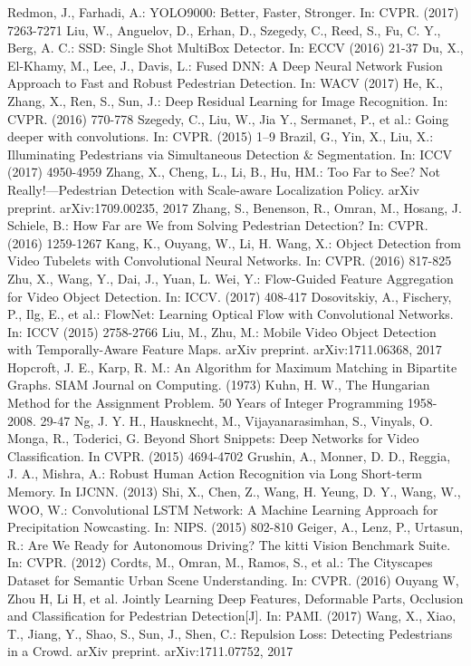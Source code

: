 \documentclass[runningheads]{llncs}
\begin{document}
\begin{thebibliography}{50}
	Redmon, J., Farhadi, A.: YOLO9000: Better, Faster, Stronger. In: CVPR. (2017) 7263-7271
    Liu, W., Anguelov, D., Erhan, D., Szegedy, C., Reed, S., Fu, C. Y., Berg, A. C.: SSD: Single Shot MultiBox Detector. In: ECCV (2016) 21-37	
 	Du, X., El-Khamy, M., Lee, J., Davis, L.: Fused DNN: A Deep Neural Network Fusion Approach to Fast and Robust Pedestrian Detection. In: WACV (2017)
 	He, K., Zhang, X., Ren, S., Sun, J.: Deep Residual Learning for Image Recognition. In: CVPR. (2016) 770-778   
	Szegedy, C., Liu, W., Jia Y., Sermanet, P., et al.: Going deeper with convolutions. In: CVPR. (2015) 1–9
	Brazil, G., Yin, X., Liu, X.: Illuminating Pedestrians via Simultaneous Detection \& Segmentation. In: ICCV (2017) 4950-4959
	Zhang, X., Cheng, L., Li, B., Hu, HM.: Too Far to See? Not Really!---Pedestrian Detection with Scale-aware Localization Policy. arXiv preprint. arXiv:1709.00235, 2017	
	Zhang, S., Benenson, R., Omran, M., Hosang, J. Schiele, B.: How Far are We from Solving Pedestrian Detection? In: CVPR. (2016) 1259-1267
	Kang, K., Ouyang, W., Li, H. Wang, X.: Object Detection from Video Tubelets with Convolutional Neural Networks. In: CVPR. (2016) 817-825
	Zhu, X., Wang, Y., Dai, J., Yuan, L. Wei, Y.: Flow-Guided Feature Aggregation for Video Object Detection. In: ICCV. (2017) 408-417 		
	Dosovitskiy, A., Fischery, P., Ilg, E., et al.: FlowNet: Learning Optical Flow with Convolutional Networks. In: ICCV (2015) 2758-2766
	Liu, M., Zhu, M.: Mobile Video Object Detection with Temporally-Aware Feature Maps. arXiv preprint. arXiv:1711.06368, 2017 		
	Hopcroft, J. E., Karp, R. M.: An  Algorithm for Maximum Matching in Bipartite Graphs. SIAM Journal on Computing. (1973) 
	Kuhn, H. W., The Hungarian Method for the Assignment Problem. 50 Years of Integer Programming 1958-2008. 29-47
	Ng, J. Y. H., Hausknecht, M., Vijayanarasimhan, S., Vinyals, O. Monga, R., Toderici, G. Beyond Short Snippets: Deep Networks for Video Classification. In CVPR. (2015) 4694-4702				
	Grushin, A., Monner, D. D., Reggia, J. A., Mishra, A.: Robust Human Action Recognition via Long Short-term Memory. In IJCNN. (2013) 
	 Shi, X., Chen, Z., Wang, H. Yeung, D. Y., Wang, W., WOO, W.: Convolutional LSTM Network: A Machine Learning Approach for Precipitation Nowcasting. In: NIPS. (2015) 802-810			
	Geiger, A., Lenz, P., Urtasun, R.: Are We Ready for Autonomous Driving? The kitti Vision Benchmark Suite. In: CVPR. (2012)
	Cordts, M., Omran, M., Ramos, S., et al.: The Cityscapes Dataset for Semantic Urban Scene Understanding. In: CVPR. (2016)
	Ouyang W, Zhou H, Li H, et al. Jointly Learning Deep Features, Deformable Parts, Occlusion and Classification for Pedestrian Detection[J]. In: PAMI. (2017) 
	Wang, X., Xiao, T., Jiang, Y., Shao, S., Sun, J., Shen, C.: Repulsion Loss: Detecting Pedestrians in a Crowd. arXiv preprint. arXiv:1711.07752, 2017
\end{thebibliography} 


\end{document}
